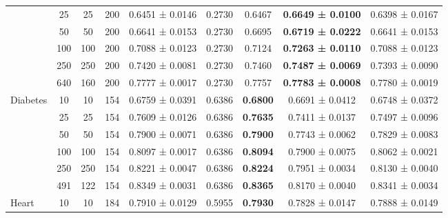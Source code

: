 \begin{table}
{\begin{tabular}[H]{@{}lcccccccc@{}}
                              & 25    & 25   & 200  & 0.6451 ± 0.0146      & 0.2730               & 0.6467          & \textbf{0.6649 ± 0.0100} & 0.6398 ± 0.0167          \\
                              & 50    & 50   & 200  & 0.6641 ± 0.0153      & 0.2730               & 0.6695          & \textbf{0.6719 ± 0.0222} & 0.6641 ± 0.0153          \\
                              & 100   & 100  & 200  & 0.7088 ± 0.0123      & 0.2730               & 0.7124          & \textbf{0.7263 ± 0.0110} & 0.7088 ± 0.0123          \\
                              & 250   & 250  & 200  & 0.7420 ± 0.0081      & 0.2730               & 0.7460          & \textbf{0.7487 ± 0.0069} & 0.7393 ± 0.0090          \\
                              & 640   & 160  & 200  & 0.7777 ± 0.0017      & 0.2730               & 0.7757          & \textbf{0.7783 ± 0.0008} & 0.7780 ± 0.0019          \\
                              \midrule
\multirow{6}{*}{Diabetes}     & 10    & 10   & 154  & 0.6759 ± 0.0391      & 0.6386               & \textbf{0.6800} & 0.6691 ± 0.0412          & 0.6748 ± 0.0372          \\
                              & 25    & 25   & 154  & 0.7609 ± 0.0126      & 0.6386               & \textbf{0.7635} & 0.7411 ± 0.0137          & 0.7497 ± 0.0096          \\
                              & 50    & 50   & 154  & 0.7900 ± 0.0071      & 0.6386               & \textbf{0.7900} & 0.7743 ± 0.0062          & 0.7829 ± 0.0083          \\
                              & 100   & 100  & 154  & 0.8097 ± 0.0017      & 0.6386               & \textbf{0.8094} & 0.7900 ± 0.0075          & 0.8062 ± 0.0021          \\
                              & 250   & 250  & 154  & 0.8221 ± 0.0047      & 0.6386               & \textbf{0.8224} & 0.7951 ± 0.0034          & 0.8130 ± 0.0040          \\
                              & 491   & 122  & 154  & 0.8349 ± 0.0031      & 0.6386               & \textbf{0.8365} & 0.8170 ± 0.0040          & 0.8341 ± 0.0034          \\
                              \midrule
\multirow{6}{*}{Heart}        & 10    & 10   & 184  & 0.7910 ± 0.0129      & 0.5955               & \textbf{0.7930} & 0.7828 ± 0.0147          & 0.7888 ± 0.0149          \\

\end{tabular}}
\end{table}

